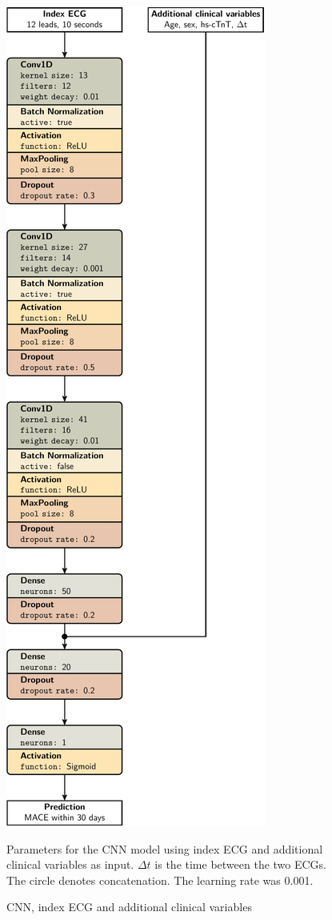 \documentclass[preprint]{elsarticle}
\begin{document}
\begin{figure}[H]
\centering
\includegraphics[scale=\modelscale,keepaspectratio,trim=-16em 0 0 0]{figures/model-cnn3.pdf}
\caption{CNN, index ECG and additional clinical variables}
\medskip
\small
Parameters for the CNN model using index ECG and additional clinical variables as input. $\Delta t$ is the time between the two ECGs. The circle denotes concatenation. The learning rate was 0.001.
\end{figure}
\end{document}
